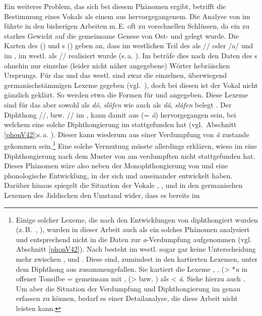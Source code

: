  
Ein weiteres Problem, das sich bei diesem Phänomen ergibt, betrifft die Bestimmung eines Vokals als einem aus  hervorgegangenem. Die Analyse von  im \hai{{\WJ}} führte in den bisherigen Arbeiten m.\,E. oft zu vorschnellen Schlüssen, da ein zu starkes Gewicht auf die gemeinsame Genese von Ost- und  gelegt wurde. Die Karten des  (\citeyear[67]{Herzog1992}) und \citeauthor{GuggenheimGruenberg1973}s (\citeyear[60–64]{GuggenheimGruenberg1973}) geben an, dass  im westlichen Teil des \hai{{\WJ}} als /\textopeno {}/ oder /a/ und im ,
 im westl. \hai{{\SWJ}} als /\textopeno \textsubarch{\textsci}/ realisiert wurde (s.\,a. \citealt{Beider2010}). Im \hai{{\WJ}} beträfe dies nach den Daten des s ohnehin nur einzelne (leider nicht näher angegebene) Wörter hebräischen Ursprungs. Für das  und das westl. \hai{{\SWJ}} sind zwar die einzelnen, überwiegend germanischstämmigen Lexeme gegeben (vgl.\, \citealt{GuggenheimGruenberg1973}), doch bei diesen ist der {\mhd} Vokal nicht gänzlich geklärt. So werden etwa die Formen für    und    angegeben. Diese Lexeme sind für das {\MHD} aber sowohl als \textit{dô}, \textit{slôfen} wie auch als \textit{dâ}, \textit{slâfen} belegt \parencite[Bd. 1, Sp. 445]{Lexer1992}. Der Diphthong /\textopeno {}/, bzw. /\textopeno \textsubarch{\textsci}/ im , kann damit aus  (= {\mhd} \textit{ô}) hervorgegangen sein, bei welchem eine solche Diphthongierung im \hai{{\WJ}} stattgefunden hat (vgl.\, Abschnitt \ref{phonV42};s.\,a. \citealt[188]{Bin-Nun1973}). Dieser kann wiederum aus einer Verdumpfung von \textit{â} zustande gekommen sein.\footnote{Einige solcher Lexeme, die nach den Entwicklungen von  diphthongiert wurden (z.\,B.\, , ), wurden in dieser Arbeit auch als ein solches Phänomen analysiert und entsprechend nicht in die Daten zur \textit{a}-Verdumpfung aufgenommen (vgl.\, Abschnitt \ref{phonV42}). Nach \cite[60f]{GuggenheimGruenberg1973} besteht im westl. \hai{{\SWJ}} sogar gar keine Unterscheidung mehr zwischen ,  und . Diese sind, zumindest in den kartierten Lexemen, unter dem Diphthong aus  zusammengefallen. Sie kartiert die Lexeme , ,  (> {\urj} *\textit{a} in offener Tonsilbe =  gemeinsam mit ,  (>  bzw. ) als < {\mhd} \textit{â}. Siehe hierzu auch \cite[115]{Timm1987}. Um aber die Situation der Verdumpfung und Diphthongierung im \hai{{\WJ}} genau erfassen zu können, bedarf es einer Detailanalyse, die diese Arbeit nicht leisten kann.} Eine solche Vermutung müsste allerdings erklären, wieso im \hai{{\OJ}} eine Diphthongierung nach dem Muster von  am verdumpften  nicht stattgefunden hat. Dieses Phänomen wäre also neben der Monophthongierung von  und  eine phonologische Entwicklung, in der sich \hai{{\WJ}} und \hai{{\OJ}} auseinander entwickelt haben. Darüber hinaus spiegelt die Situation der Vokale , ,  und  in den germanischen Lexemen des Jiddischen den Umstand wider, dass es bereits im {\MHD} 
